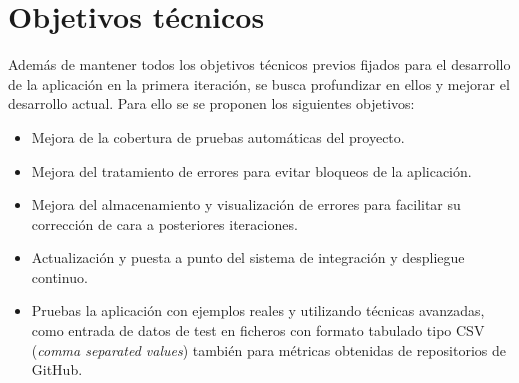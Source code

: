 \section{Objetivos técnicos}
Además de mantener todos los objetivos técnicos previos fijados para el desarrollo de la aplicación en la primera iteración, se busca profundizar en ellos y mejorar el desarrollo actual. Para ello se se proponen los siguientes objetivos:
\begin{itemize}
	\tightlist
	\item Mejora de la cobertura de pruebas automáticas del proyecto. 
	\item Mejora del tratamiento de errores para evitar bloqueos de la aplicación.
	\item Mejora del almacenamiento y visualización de errores para facilitar su corrección de cara a posteriores iteraciones.
	\item Actualización y puesta a punto del sistema de integración y despliegue continuo.
	\item Pruebas la aplicación con ejemplos reales y utilizando técnicas avanzadas, como entrada de datos de test en ficheros con formato tabulado tipo CSV (\textit{comma separated values}) también para métricas obtenidas de repositorios de GitHub. 	
\end{itemize}



